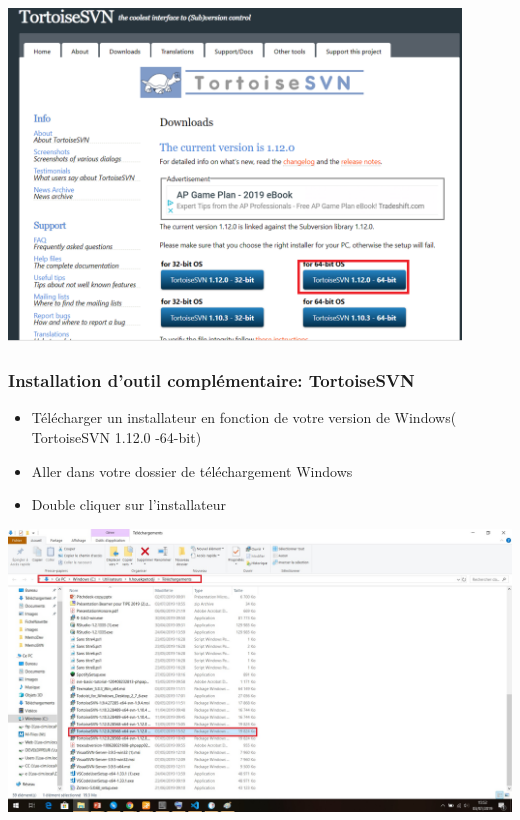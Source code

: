 \documentclass{beamer}
\begin{document}
\includegraphics[width=0.9\textwidth]{../images/tortoisesvnDownload.png}
\begin{frame}
\frametitle{Installation d'outil complémentaire: TortoiseSVN }
\begin{itemize}
\item Télécharger un installateur en fonction de votre version de Windows( TortoiseSVN 1.12.0 -64-bit) 
\item Aller dans votre dossier de téléchargement Windows 
\item Double cliquer sur l'installateur
\end{itemize}
\end{frame}

\begin{frame}
\includegraphics[width=\textwidth]{../images/tortoiseSvnDownloded.jpg}
\end{frame}
\end{document}
